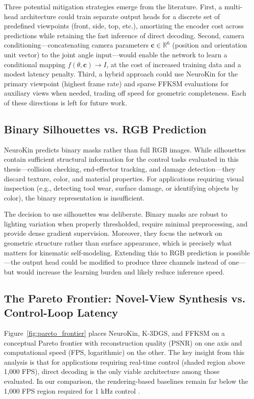 \documentclass[12pt,a4paper,oneside]{report}
\begin{document}
Three potential mitigation strategies emerge from the literature. First, a multi-head architecture could train separate output heads for a discrete set of predefined viewpoints (front, side, top, etc.), amortizing the encoder cost across predictions while retaining the fast inference of direct decoding. Second, camera conditioning---concatenating camera parameters $\mathbf{c} \in \mathbb{R}^6$ (position and orientation unit vector) to the joint angle input---would enable the network to learn a conditional mapping $f(\theta, \mathbf{c}) \rightarrow I$, at the cost of increased training data and a modest latency penalty. Third, a hybrid approach could use NeuroKin for the primary viewpoint (highest frame rate) and sparse FFKSM evaluations for auxiliary views when needed, trading off speed for geometric completeness. Each of these directions is left for future work.

\subsection{Binary Silhouettes vs. RGB Prediction}

NeuroKin predicts binary masks rather than full RGB images. While silhouettes contain sufficient structural information for the control tasks evaluated in this thesis---collision checking, end-effector tracking, and damage detection---they discard texture, color, and material properties. For applications requiring visual inspection (e.g., detecting tool wear, surface damage, or identifying objects by color), the binary representation is insufficient.

The decision to use silhouettes was deliberate. Binary masks are robust to lighting variation when properly thresholded, require minimal preprocessing, and provide dense gradient supervision. Moreover, they focus the network on geometric structure rather than surface appearance, which is precisely what matters for kinematic self-modeling. Extending this to RGB prediction is possible---the output head could be modified to produce three channels instead of one---but would increase the learning burden and likely reduce inference speed.

\subsection{The Pareto Frontier: Novel-View Synthesis vs. Control-Loop Latency}

Figure~\ref{fig:pareto_frontier} places NeuroKin, K-3DGS, and FFKSM on a conceptual Pareto frontier with reconstruction quality (PSNR) on one axis and computational speed (FPS, logarithmic) on the other. The key insight from this analysis is that for applications requiring real-time control (shaded region above 1,000 FPS), direct decoding is the only viable architecture among those evaluated. In our comparison, the rendering-based baselines remain far below the 1,000 FPS region required for 1 kHz control \cite{hu2025learning}.
\end{document}
